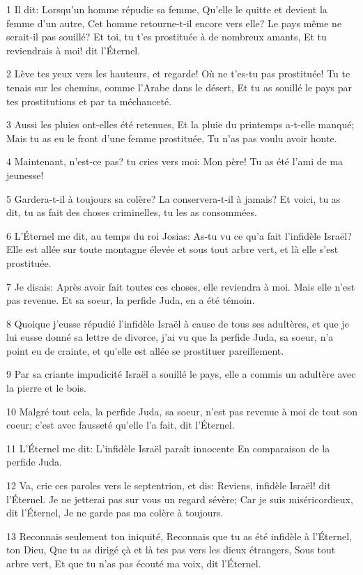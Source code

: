 \par 1 Il dit: Lorsqu'un homme répudie sa femme, Qu'elle le quitte et devient la femme d'un autre, Cet homme retourne-t-il encore vers elle? Le pays même ne serait-il pas souillé? Et toi, tu t'es prostituée à de nombreux amants, Et tu reviendrais à moi! dit l'Éternel.
\par 2 Lève tes yeux vers les hauteurs, et regarde! Où ne t'es-tu pas prostituée! Tu te tenais sur les chemins, comme l'Arabe dans le désert, Et tu as souillé le pays par tes prostitutions et par ta méchanceté.
\par 3 Aussi les pluies ont-elles été retenues, Et la pluie du printemps a-t-elle manqué; Mais tu as eu le front d'une femme prostituée, Tu n'as pas voulu avoir honte.
\par 4 Maintenant, n'est-ce pas? tu cries vers moi: Mon père! Tu as été l'ami de ma jeunesse!
\par 5 Gardera-t-il à toujours sa colère? La conservera-t-il à jamais? Et voici, tu as dit, tu as fait des choses criminelles, tu les as consommées.
\par 6 L'Éternel me dit, au temps du roi Josias: As-tu vu ce qu'a fait l'infidèle Israël? Elle est allée sur toute montagne élevée et sous tout arbre vert, et là elle s'est prostituée.
\par 7 Je disais: Après avoir fait toutes ces choses, elle reviendra à moi. Mais elle n'est pas revenue. Et sa soeur, la perfide Juda, en a été témoin.
\par 8 Quoique j'eusse répudié l'infidèle Israël à cause de tous ses adultères, et que je lui eusse donné sa lettre de divorce, j'ai vu que la perfide Juda, sa soeur, n'a point eu de crainte, et qu'elle est allée se prostituer pareillement.
\par 9 Par sa criante impudicité Israël a souillé le pays, elle a commis un adultère avec la pierre et le bois.
\par 10 Malgré tout cela, la perfide Juda, sa soeur, n'est pas revenue à moi de tout son coeur; c'est avec fausseté qu'elle l'a fait, dit l'Éternel.
\par 11 L'Éternel me dit: L'infidèle Israël paraît innocente En comparaison de la perfide Juda.
\par 12 Va, crie ces paroles vers le septentrion, et dis: Reviens, infidèle Israël! dit l'Éternel. Je ne jetterai pas sur vous un regard sévère; Car je suis miséricordieux, dit l'Éternel, Je ne garde pas ma colère à toujours.
\par 13 Reconnais seulement ton iniquité, Reconnais que tu as été infidèle à l'Éternel, ton Dieu, Que tu as dirigé çà et là tes pas vers les dieux étrangers, Sous tout arbre vert, Et que tu n'as pas écouté ma voix, dit l'Éternel.
